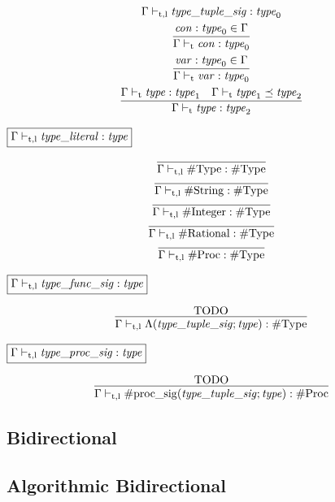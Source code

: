 \begin{gather*}
{        \Gamma \vdash_{\mathrm{t}, \mathrm{l}} \mathit{type\_tuple\_sig}: \mathit{type}_0
    }
    \\
    \infer{\Gamma \vdash_\mathrm{t} \mathit{con}: \mathit{type}_0}{
        \mathit{con}: \mathit{type}_0 \in \Gamma
    }
    \\
    \infer{\Gamma \vdash_\mathrm{t} \mathit{var}: \mathit{type}_0}{
        \mathit{var}: \mathit{type}_0 \in \Gamma
    }
    \\
    \infer{\Gamma \vdash_\mathrm{t} \mathit{type}: \mathit{type}_2}{
        \Gamma \vdash_\mathrm{t} \mathit{type}: \mathit{type}_1
        &
        \Gamma \vdash_\mathrm{t} \mathit{type}_1 \preceq \mathit{type}_2
    }
\end{gather*}

$\fbox{$\Gamma \vdash_{\mathrm{t}, \mathrm{l}} \mathit{type\_literal}: \mathit{type}$}$

\begin{gather*}
    \infer{\Gamma \vdash_{\mathrm{t}, \mathrm{l}} \mathrm{\#Type}: \mathrm{\#Type}}{}
    \\
    \infer{\Gamma \vdash_{\mathrm{t}, \mathrm{l}} \mathrm{\#String}: \mathrm{\#Type}}{}
    \\
    \infer{\Gamma \vdash_{\mathrm{t}, \mathrm{l}} \mathrm{\#Integer}: \mathrm{\#Type}}{}
    \\
    \infer{\Gamma \vdash_{\mathrm{t}, \mathrm{l}} \mathrm{\#Rational}: \mathrm{\#Type}}{}
    \\
    \infer{\Gamma \vdash_{\mathrm{t}, \mathrm{l}} \mathrm{\#Proc}: \mathrm{\#Type}}{}
\end{gather*}

$\fbox{$\Gamma \vdash_{\mathrm{t}, \mathrm{l}} \mathit{type\_func\_sig}: \mathit{type}$}$

\begin{gather*}
    \infer{\Gamma \vdash_{\mathrm{t}, \mathrm{l}} \Lambda(\mathit{type\_tuple\_sig}; \mathit{type}): \mathrm{\#Type}}{
        \text{TODO}
    }
\end{gather*}

$\fbox{$\Gamma \vdash_{\mathrm{t}, \mathrm{l}} \mathit{type\_proc\_sig}: \mathit{type}$}$

\begin{gather*}
    \infer{\Gamma \vdash_{\mathrm{t}, \mathrm{l}} \mathrm{\#proc\_sig}(\mathit{type\_tuple\_sig}; \mathit{type}): \mathrm{\#Proc}}{
        \text{TODO}
    }
\end{gather*}

\subsection{Bidirectional}

\subsection{Algorithmic Bidirectional}
